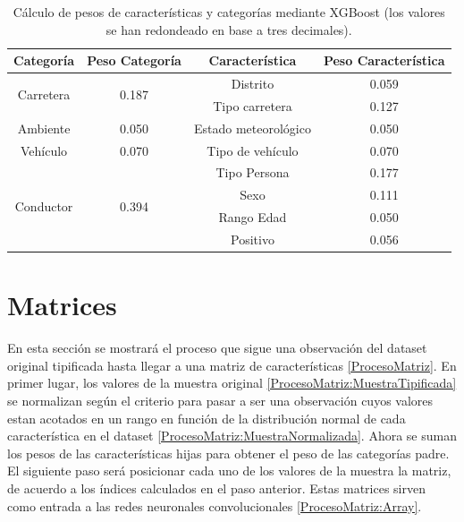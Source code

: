   \begin{table}[H]
    \small
    \centering                            
    \begin{tabular}{ |c|c|c|c| }
         \hline
         \textbf{Categoría} & \textbf{Peso Categoría} & \textbf{Característica} & \textbf{Peso Característica}\\
         \hline

         \multirow{2}{*}{Carretera}   & \multirow{2}{*}{0.187}        & Distrito              & 0.059\\      
                                      &                               & Tipo carretera        & 0.127\\

         \hline
         \multirow{1}{*}{Ambiente}    & \multirow{1}{*}{0.050}        & Estado meteorológico  & 0.050\\

         \hline
         \multirow{1}{*}{Vehículo}    & \multirow{1}{*}{0.070}        & Tipo de vehículo      & 0.070\\


         \hline
         \multirow{4}{*}{Conductor}   & \multirow{4}{*}{0.394}        & Tipo Persona          & 0.177\\
                                      &                               & Sexo                  & 0.111\\
                                      &                               & Rango Edad            & 0.050\\
                                      &                               & Positivo              & 0.056\\
         \hline

    \end{tabular}

    \caption{Cálculo de pesos de características y categorías mediante XGBoost (los valores se han redondeado en base a tres decimales).}
    \label{PesosFinalesCaracteristicas}
  \end{table}

\section{Matrices}

  En esta sección se mostrará el proceso que sigue una observación del dataset original tipificada hasta llegar a una matriz de características \eqref{ProcesoMatriz}. En primer lugar, los valores de la muestra original \eqref{ProcesoMatriz:MuestraTipificada} se normalizan según el criterio  para pasar a ser una observación cuyos valores estan acotados en un rango en función de la distribución normal de cada característica en el dataset \eqref{ProcesoMatriz:MuestraNormalizada}. Ahora se suman los pesos de las características hijas para obtener el peso de las categorías padre. El siguiente paso será posicionar cada uno de los valores de la muestra la matriz, de acuerdo a los índices calculados en el paso anterior. Estas matrices sirven como entrada a las redes neuronales convolucionales \eqref{ProcesoMatriz:Array}.

